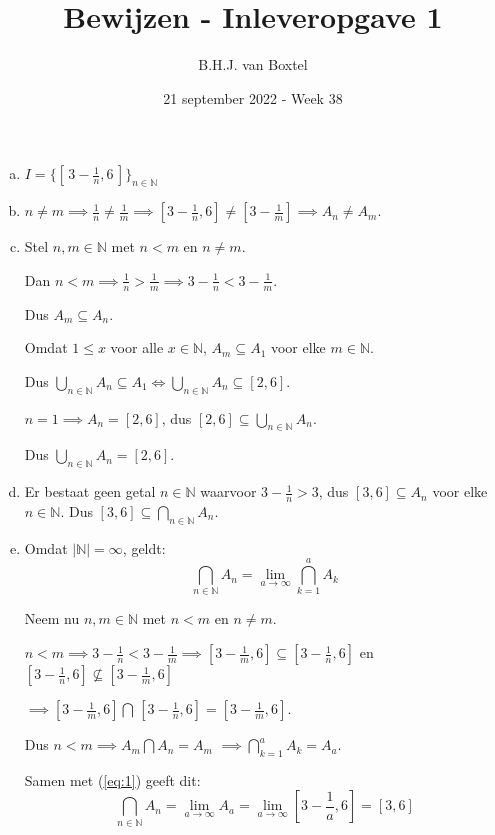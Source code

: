\documentclass[12pt, a4paper]{article}
\begin{document}
\title{Bewijzen - Inleveropgave 1}
\author{B.H.J. van Boxtel}
\date{21 september 2022 - Week 38} 

\maketitle
{}

\begin{enumerate}[(a).] 
    \item $I = \{[\, 3 - \frac{1}{n}, 6 \,]\}_{n \in \mathbb{N}}$
    \bigskip
    \item $n \neq m \implies \frac{1}{n} \neq \frac{1}{m} \implies [3 -\frac{1}{n}, 6] \neq [3 - \frac{1}{m}] \implies A_n \neq A_m$.
    \bigskip
    \item Stel $n,m \in \mathbb{N}$ met $n < m$ en $n \neq m$.
    
    Dan $n < m \implies \frac{1}{n} > \frac{1}{m} \implies 3 - \frac{1}{n} < 3 - \frac{1}{m}$.

    Dus $A_m \subseteq A_n$.

    Omdat $1 \leq x$ voor alle $x \in \mathbb{N}$, $ A_m \subseteq A_1$ voor elke $m \in \mathbb{N}$.

    Dus $\bigcup_{n \in \mathbb{N}} A_n \subseteq A_1 \iff \bigcup_{n \in \mathbb{N}} A_n \subseteq [2,6]$.
    \bigskip

    $n = 1 \implies A_n = [2,6]$, dus $[2,6] \subseteq \bigcup_{n \in \mathbb{N}} A_n$.

    Dus $\bigcup_{n \in \mathbb{N}} A_n = [2,6]$.
    \bigskip

    \item Er bestaat geen getal $n \in \mathbb{N}$ waarvoor $3 - \frac{1}{n} > 3$, dus $[3,6] \subseteq A_n$ voor elke $n \in \mathbb{N}$. Dus $[3,6] \subseteq \bigcap_{n \in \mathbb{N}} A_n$.
    \bigskip

    \item Omdat $\lvert \mathbb{N} \rvert = \infty$, geldt:
    \begin{equation} \label{eq:1}
        \bigcap_{n \in \mathbb{N}} A_n = \lim_{a\to\infty}\bigcap_{k = 1}^{a} A_k
    \end{equation}

    Neem nu $n,m \in \mathbb{N}$ met $n < m$ en $n \neq m$.

    $n < m \implies 3 - \frac{1}{n} < 3 - \frac{1}{m} \implies [3 - \frac{1}{m}, 6] \subseteq [3 - \frac{1}{n}, 6]$ en $[3 - \frac{1}{n}, 6] \nsubseteq [3 - \frac{1}{m}, 6]$
    
    $\implies [3 - \frac{1}{m}, 6] \bigcap \, [3 - \frac{1}{n}, 6] = [3 - \frac{1}{m}, 6].$ 
    
    Dus $n < m \implies A_m \bigcap A_n = A_m$ $\implies \bigcap_{k = 1}^{a} A_k = A_a$.
    \bigskip

    Samen met (\ref{eq:1}) geeft dit:
    \begin{equation}
        \bigcap_{n \in \mathbb{N}} A_n = \lim_{a\to\infty}A_a = \lim_{a\to\infty} [3 - \frac{1}{a}, 6] = [3 , 6]
    \end{equation}

\end{enumerate}
\end{document}
